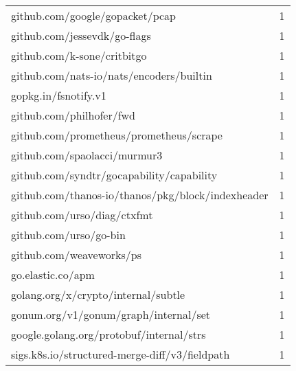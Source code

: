 \begin{longtable}{lr}
    github.com/google/gopacket/pcap &        1 \\
    github.com/jessevdk/go-flags &        1 \\
    github.com/k-sone/critbitgo &        1 \\
    github.com/nats-io/nats/encoders/builtin &        1 \\
    gopkg.in/fsnotify.v1 &        1 \\
    github.com/philhofer/fwd &        1 \\
    github.com/prometheus/prometheus/scrape &        1 \\
    github.com/spaolacci/murmur3 &        1 \\
    github.com/syndtr/gocapability/capability &        1 \\
    github.com/thanos-io/thanos/pkg/block/indexheader &        1 \\
    github.com/urso/diag/ctxfmt &        1 \\
    github.com/urso/go-bin &        1 \\
    github.com/weaveworks/ps &        1 \\
    go.elastic.co/apm &        1 \\
    golang.org/x/crypto/internal/subtle &        1 \\
    gonum.org/v1/gonum/graph/internal/set &        1 \\
    google.golang.org/protobuf/internal/strs &        1 \\
    sigs.k8s.io/structured-merge-diff/v3/fieldpath &        1 \\
\end{longtable}

